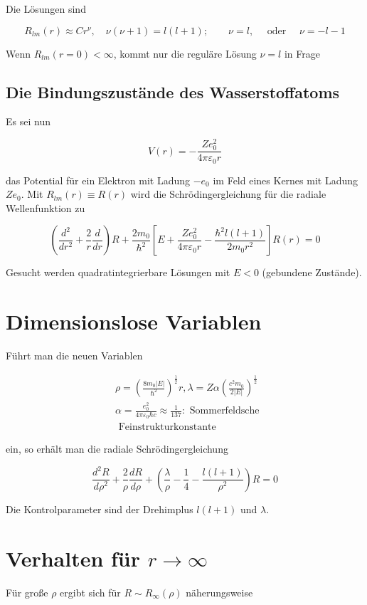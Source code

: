 \documentclass[10pt, letterpaper]{article}
\begin{document}
Die Lösungen sind

$$
R_{l m}(r) \approx C r^{\nu}, \quad \nu(\nu+1)=l(l+1) ; \quad \quad \nu=l, \quad \text { oder } \quad \nu=-l-1
$$

Wenn $R_{l m}(r=0)<\infty$, kommt nur die reguläre Lösung $\nu=l$ in Frage

\subsection*{Die Bindungszustände des Wasserstoffatoms}
Es sei nun

$$
V(r)=-\frac{Z e_{0}^{2}}{4 \pi \varepsilon_{0} r}
$$

das Potential für ein Elektron mit Ladung $-e_{0}$ im Feld eines Kernes mit Ladung $Z e_{0}$. Mit $R_{l m}(r) \equiv R(r)$ wird die Schrödingergleichung für die radiale Wellenfunktion zu

$$
\left(\frac{d^{2}}{d r^{2}}+\frac{2}{r} \frac{d}{d r}\right) R+\frac{2 m_{0}}{\hbar^{2}}\left[E+\frac{Z e_{0}^{2}}{4 \pi \varepsilon_{0} r}-\frac{\hbar^{2} l(l+1)}{2 m_{0} r^{2}}\right] R(r)=0
$$

Gesucht werden quadratintegrierbare Lösungen mit $E<0$ (gebundene Zustände).

\section*{Dimensionslose Variablen}
Führt man die neuen Variablen

$$
\begin{aligned}
& \rho=\left(\frac{8 m_{0}|E|}{\hbar^{2}}\right)^{\frac{1}{2}} r, \lambda=Z \alpha\left(\frac{c^{2} m_{0}}{2|E|}\right)^{\frac{1}{2}} \\
& \alpha=\frac{e_{0}^{2}}{4 \pi \varepsilon_{0} \hbar c} \approx \frac{1}{137}: \text { Sommerfeldsche } \\
& \text { Feinstrukturkonstante }
\end{aligned}
$$

ein, so erhält man die radiale Schrödingergleichung

$$
\frac{d^{2} R}{d \rho^{2}}+\frac{2}{\rho} \frac{d R}{d \rho}+\left(\frac{\lambda}{\rho}-\frac{1}{4}-\frac{l(l+1)}{\rho^{2}}\right) R=0
$$

Die Kontrolparameter sind der Drehimplus $l(l+1)$ und $\lambda$.

\section*{Verhalten für $r \rightarrow \infty$}
Für große $\rho$ ergibt sich für $R \sim R_{\infty}(\rho)$ näherungsweise
\end{document}
